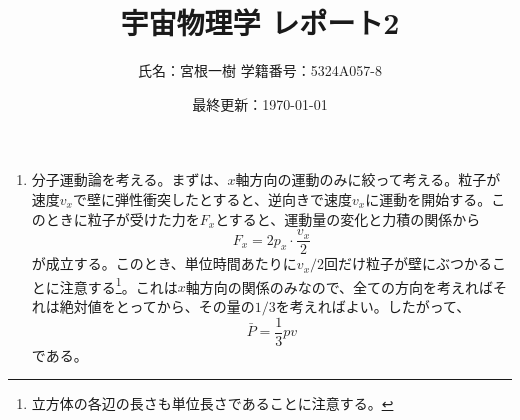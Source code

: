 \documentclass[unicode,a4paper,10pt]{ltjsarticle}
\begin{document}
\title{
  宇宙物理学
  \quad
  レポート2
}
\author{
  氏名：宮根一樹
  \quad
  学籍番号：5324A057-8
}
\date{最終更新：\today}

\maketitle

\begin{enumerate}
  \item 
  分子運動論を考える。まずは、$x$軸方向の運動のみに絞って考える。粒子が速度$v_{x}$で壁に弾性衝突したとすると、逆向きで速度$v_{x}$に運動を開始する。このときに粒子が受けた力を$F_{x}$とすると、運動量の変化と力積の関係から
  \begin{equation}
    F_{x}
    =
    2p_{x}\cdot\frac{v_{x}}{2}
  \end{equation}
  が成立する。このとき、単位時間あたりに$v_{x}/2$回だけ粒子が壁にぶつかることに注意する\footnote{
    立方体の各辺の長さも単位長さであることに注意する。
  }。これは$x$軸方向の関係のみなので、全ての方向を考えればそれは絶対値をとってから、その量の$1/3$を考えればよい。したがって、
  \begin{equation}
    \bar{P}
    =
    \frac{1}{3}pv
  \end{equation}
  である。


\end{enumerate}
\end{document}
